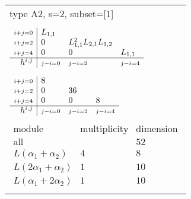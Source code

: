 \documentclass[crop,border=2mm]{standalone}
\begin{document}
\begin{tabular}{l}
{\huge type A2, s=2, subset=[1]}\\ \\


$\displaystyle
\begin{array}{r|l l l}
	{\scriptstyle i+j=0}&L_{1,1}&&\\
	{\scriptstyle i+j=2}&0&L_{1,1}^{2}L_{2,1}L_{1,2}&\\
	{\scriptstyle i+j=4}&0&0&L_{1,1}\\
	\hline h^{i,j}&{\scriptstyle j-i=0}&{\scriptstyle j-i=2}&{\scriptstyle j-i=4}
\end{array}
$ \\ \\


$\displaystyle
\begin{array}{r|l l l}
	{\scriptstyle i+j=0}&8&&\\
	{\scriptstyle i+j=2}&0&36&\\
	{\scriptstyle i+j=4}&0&0&8\\
	\hline h^{i,j}&{\scriptstyle j-i=0}&{\scriptstyle j-i=2}&{\scriptstyle j-i=4}
\end{array}
$ \\ \\


$\displaystyle
\begin{array}{rll}
	\text{module}&\text{multiplicity}&\text{dimension} \\ \hline \text{all}&&52 \\
	L\left(\alpha_{1}+\alpha_{2}\right)&4&8\\
	L\left( 2\alpha_{1}+\alpha_{2}\right)&1&10\\
	L\left(\alpha_{1}+ 2\alpha_{2}\right)&1&10
\end{array}
$ \\ \\

\end{tabular}
\end{document}
